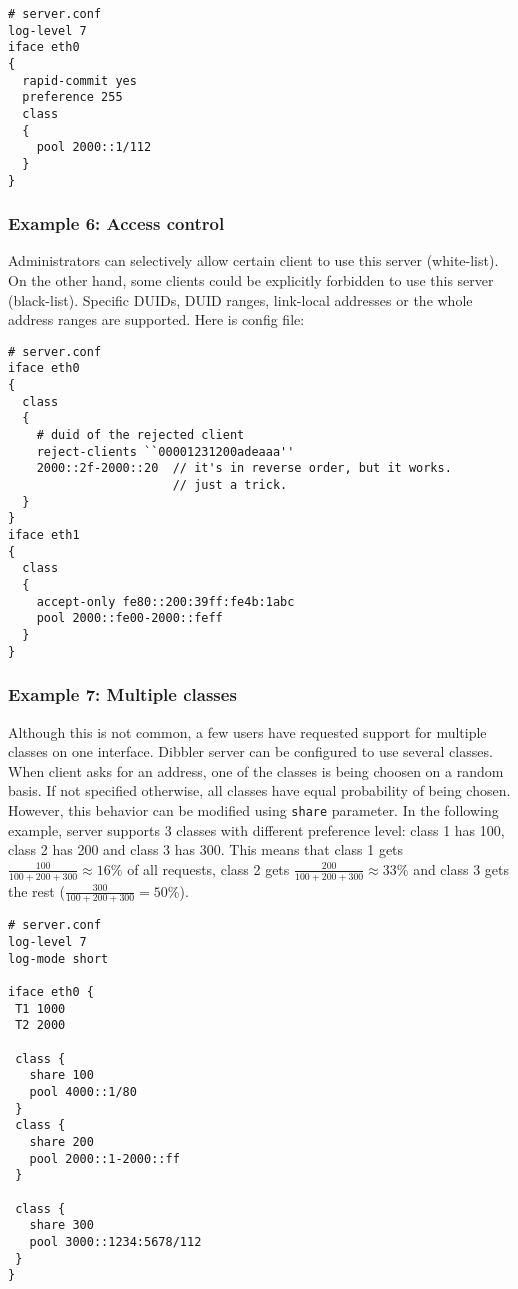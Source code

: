 \begin{lstlisting}
# server.conf
log-level 7
iface eth0
{
  rapid-commit yes
  preference 255
  class
  {
    pool 2000::1/112
  }
}
\end{lstlisting}

\subsubsection{Example 6: Access control}
Administrators can selectively allow certain client to use this
server (white-list). On the other hand, some clients could be
explicitly forbidden to use this server (black-list). Specific DUIDs,
DUID ranges, link-local addresses or the whole address ranges are
supported. Here is config file:

\begin{lstlisting}
# server.conf
iface eth0
{
  class
  {
    # duid of the rejected client
    reject-clients ``00001231200adeaaa''
    2000::2f-2000::20  // it's in reverse order, but it works.
                       // just a trick.
  }
}
iface eth1
{
  class
  {
    accept-only fe80::200:39ff:fe4b:1abc
    pool 2000::fe00-2000::feff
  }
}
\end{lstlisting}

\subsubsection{Example 7: Multiple classes}
\label{example-server-multiple-classes}
Although this is not common, a few users have requested support for multiple classes on one interface.
Dibbler server can be configured to use several classes. When client asks for an address, one of the classes
is being choosen on a random basis. If not specified otherwise, all classes have equal probability of being chosen.
However, this behavior can be modified using \verb+share+ parameter. In the following example, server supports
3 classes with different preference level: class 1 has 100, class 2 has 200 and class 3 has 300. This means that class 1
gets $\frac{100}{100+200+300} \approx 16\% $ of all requests, class 2
gets $\frac{200}{100+200+300} \approx 33\% $ and class 3 gets the rest
($\frac{300}{100+200+300}=50\% $).

\begin{lstlisting}
# server.conf
log-level 7
log-mode short

iface eth0 {
 T1 1000
 T2 2000

 class {
   share 100
   pool 4000::1/80
 }
 class {
   share 200
   pool 2000::1-2000::ff
 }

 class {
   share 300
   pool 3000::1234:5678/112
 }
}
\end{lstlisting}


